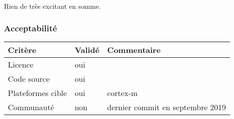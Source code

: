 Rien de très excitant en somme.

\subsubsection{Acceptabilité}
\begin{tabular}{lll}
\toprule
	Critère				&	Validé		&	Commentaire	\\
\midrule
	Licence				&	oui			&		\\
	Code source			&	oui			&		\\
	Plateformes cible	&	oui			&	cortex-m	\\
	Communauté			&	non			&	dernier commit en septembre 2019	\\
\bottomrule
\end{tabular}

